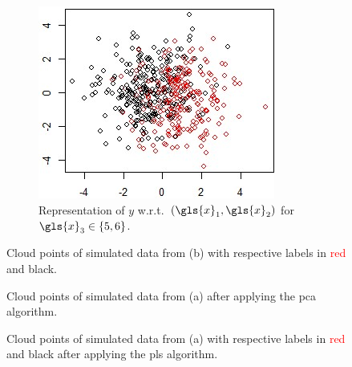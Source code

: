 \begin{figure}
\begin{subfigure}[t]{0.32\textwidth}
\label{fig:simu2}
\end{subfigure}
\begin{subfigure}[t]{0.32\textwidth}
\includegraphics[width=\textwidth]{figures/chapitre6/graph_simu_3.jpg}
\caption{Representation of $y$ w.r.t.\ $(\gls{x}_1,\gls{x}_2)$ for $\gls{x}_3 \in \{5,6\}$.}
\label{fig:simu3}
\end{subfigure}
\caption{Cloud points of simulated data from (b) with respective labels in \textcolor{red}{red} and black.}
\label{fig:simu}
\end{figure}

\begin{figure}
\centering \resizebox{.7\textwidth}{!}{}
\caption{Cloud points of simulated data from (a) after applying the \gls{pca} algorithm.}
\label{fig:simu_a_famd}
\end{figure}

\begin{figure}
\centering \resizebox{.7\textwidth}{!}{}
\caption{Cloud points of simulated data from (a) with respective labels in \textcolor{red}{red} and black after applying the \gls{pls} algorithm.}
\label{fig:simu_a_pls}
\end{figure}


